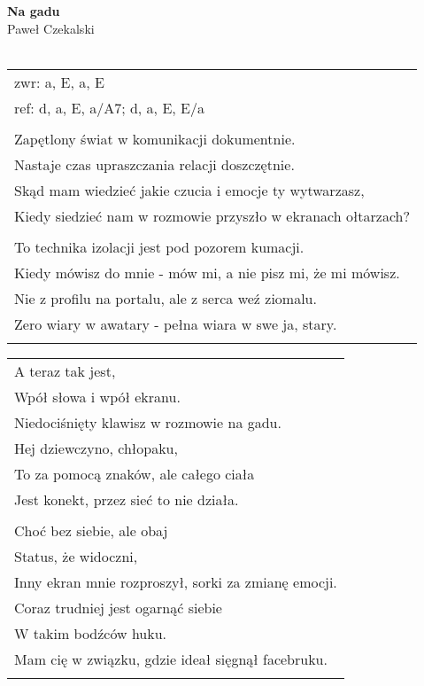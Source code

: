 \documentclass[a5paper]{article}
\begin{document}


\noindent
\fontsize{12pt}{15pt}\selectfont
\textbf{Na gadu} \\
\fontsize{8pt}{10pt}\selectfont
Paweł Czekalski \\ \\
\fontsize{10pt}{12pt}\selectfont
{}
\begin{tabular}{@{}p{12cm}@{}}
\noindent
zwr: a, E, a, E \\
ref: d, a, E, a/A7; d, a, E, E/a \\ \\

Zapętlony świat w komunikacji dokumentnie. \\
Nastaje czas upraszczania relacji doszczętnie. \\
Skąd mam wiedzieć jakie czucia i emocje ty wytwarzasz, \\
Kiedy siedzieć nam w rozmowie przyszło w ekranach ołtarzach? \\ \\

To technika izolacji jest pod pozorem kumacji. \\
Kiedy mówisz do mnie - mów mi, a nie pisz mi, że mi mówisz. \\
Nie z profilu na portalu, ale z serca weź ziomalu. \\
Zero wiary w awatary - pełna wiara w swe ja, stary. \\ \\
\end{tabular}

\noindent
\begin{tabular}{@{}p{12cm}@{}}
A teraz tak jest, \\
Wpół słowa i wpół ekranu. \\
Niedociśnięty klawisz w rozmowie na gadu. \\
Hej dziewczyno, chłopaku, \\
To za pomocą znaków, ale całego ciała \\
Jest konekt, przez sieć to nie działa. \\ \\
Choć bez siebie, ale obaj \\
Status, że widoczni, \\
Inny ekran mnie rozproszył, sorki za zmianę emocji. \\
Coraz trudniej jest ogarnąć siebie \\
W takim bodźców huku. \\
Mam cię w związku, gdzie ideał sięgnął facebruku. \\ \\
\end{tabular}
\end{document}
